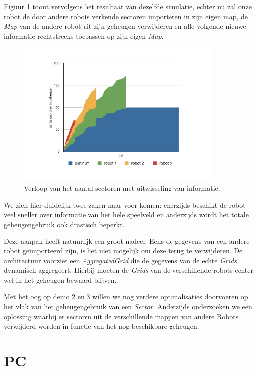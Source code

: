 \documentclass[12pt,a4paper]{report}
\begin{document}
Figuur \ref{chart:sectors-with-merge} toont vervolgens het resultaat van dezelfde simulatie, echter nu zal onze robot de door andere robots verkende sectoren importeren in zijn eigen map, de \emph{Map} van de andere robot uit zijn geheugen verwijderen en alle volgende nieuwe informatie rechtstreeks toepassen op zijn eigen \emph{Map}.

\begin{figure}[htbp]
  \centering
  \includegraphics[width=100mm]{resources/sectors-with-merge.pdf}
  \caption{Verloop van het aantal sectoren met uitwisseling van informatie.}
  \label{chart:sectors-with-merge}
\end{figure}

We zien hier duidelijk twee zaken naar voor komen: enerzijds beschikt de robot veel sneller over informatie van het hele speelveld en anderzijds wordt het totale geheugengebruik ook drastisch beperkt.

Deze aanpak heeft natuurlijk een groot nadeel. Eens de gegevens van een andere robot ge\"importeerd zijn, is het niet mogelijk om deze terug te verwijderen. De architectuur voorziet een \emph{AggregatedGrid} die de gegevens van de echte \emph{Grids} dynamisch aggregeert. Hierbij moeten de \emph{Grids}  van de verschillende robots echter wel in het geheugen bewaard blijven.

Met het oog op demo 2 en 3 willen we nog verdere optimalisaties doorvoeren op het vlak van het geheugengebruik van een \emph{Sector}. Anderzijds onderzoeken we een oplossing waarbij er sectoren uit de verschillende mappen van andere Robots verwijderd worden in functie van het nog beschikbare geheugen.

\section{PC}
\end{document}
